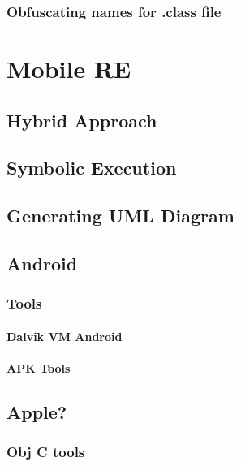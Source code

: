 \subsubsection{Obfuscating names for .class file}

\section{Mobile RE}
\subsection{Hybrid Approach}
\subsection{Symbolic Execution}
\subsection{Generating UML Diagram}
\subsection{Android}
\subsubsection{Tools}
\paragraph{Dalvik VM Android}
\paragraph{APK Tools}
\subsection{Apple?}
\subsubsection{Obj C tools}
